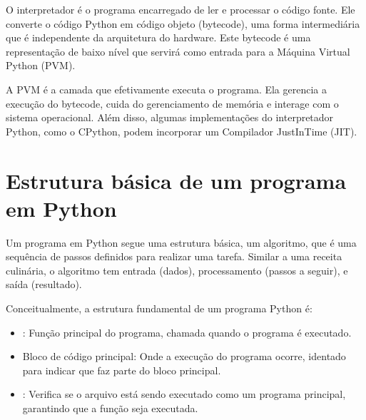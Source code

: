 \documentclass[letterpaper,10pt,english]{jupyterBook}
\begin{document}
\sphinxAtStartPar
O interpretador é o programa encarregado de ler e processar o código fonte. Ele converte o código Python em código objeto (bytecode), uma forma intermediária que é independente da arquitetura do hardware. Este bytecode é uma representação de baixo nível que servirá como entrada para a Máquina Virtual Python (PVM).

\sphinxAtStartPar
A PVM é a camada que efetivamente executa o programa. Ela gerencia a execução do bytecode, cuida do gerenciamento de memória e interage com o sistema operacional. Além disso, algumas implementações do interpretador Python, como o CPython, podem incorporar um Compilador Just\sphinxhyphen{}In\sphinxhyphen{}Time (JIT).




\section{Estrutura básica de um programa em Python}
\label{\detokenize{chapters/ch1/ch1:estrutura-basica-de-um-programa-em-python}}
\sphinxAtStartPar
Um programa em Python segue uma estrutura básica, um algoritmo, que é uma sequência de passos definidos para realizar uma tarefa. Similar a uma receita culinária, o algoritmo tem entrada (dados), processamento (passos a seguir), e saída (resultado).

\sphinxAtStartPar
Conceitualmente, a estrutura fundamental de um programa Python é:

\begin{sphinxVerbatim}[commandchars=\\\{\}]
 

   
\end{sphinxVerbatim}
\begin{itemize}
\item {} 
\sphinxAtStartPar
{}: Função principal do programa, chamada quando o programa é executado.

\item {} 
\sphinxAtStartPar
Bloco de código principal: Onde a execução do programa ocorre, identado para indicar que faz parte do bloco principal.

\item {} 
\sphinxAtStartPar
{}: Verifica se o arquivo está sendo executado como um programa principal, garantindo que a função  seja executada.

\end{itemize}
\end{document}

